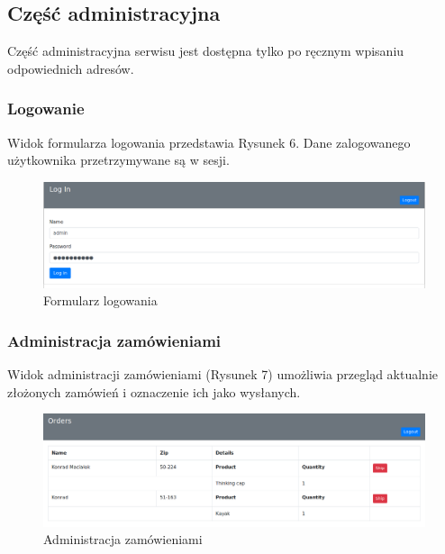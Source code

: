 \documentclass[a4paper,10pt]{article}
\begin{document}
\subsection{Część administracyjna}
Część administracyjna serwisu jest dostępna tylko po ręcznym wpisaniu odpowiednich adresów.

\subsubsection{Logowanie}
Widok formularza logowania przedstawia Rysunek 6. Dane zalogowanego użytkownika przetrzymywane są w sesji.

\begin{figure}
 \centering
 \includegraphics[width=\linewidth]{Images/login.png}
 \caption{Formularz logowania}
 \label{rys:}
\end{figure}

\subsubsection{Administracja zamówieniami}
Widok administracji zamówieniami (Rysunek 7) umożliwia przegląd aktualnie złożonych zamówień i oznaczenie ich jako wysłanych.

\begin{figure}
 \centering
 \includegraphics[width=\linewidth]{Images/order_confirm.png}
 \caption{Administracja zamówieniami}
 \label{rys:}
\end{figure}
\end{document}
